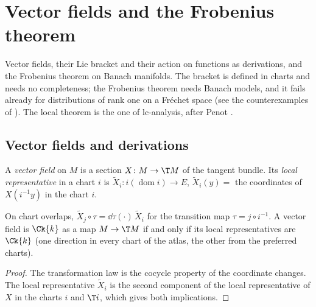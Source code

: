 \chapter{Vector fields and the Frobenius theorem}
\label{chap:vectorfields}

Vector fields, their Lie bracket and their action on functions as derivations, and the Frobenius
theorem on Banach manifolds. The bracket is defined in charts and needs no completeness; the
Frobenius theorem needs Banach models, and it fails already for distributions of rank one on a
Fréchet space (see the counterexamples of \cite{LCA}). The local theorem is the one of
lc-analysis, after Penot \cite{Pen70}.

\section{Vector fields and derivations}

\begin{definition}
  \label{def:vector-field}
  \leanok
  A \emph{vector field} on $M$ is a section $X \colon M \to \T M$ of the tangent bundle. Its
  \emph{local representative} in a chart $i$ is $\widetilde{X}_i \colon i(\operatorname{dom} i)
  \to E$, $\widetilde{X}_i(y) = $ the coordinates of $X(i^{-1}y)$ in the chart $i$.
\end{definition}

\begin{proposition}
  \label{prop:man-localrep}
  \leanok
  On chart overlaps, $\widetilde{X}_j \circ \tau = \dd\tau(\cdot)\,\widetilde{X}_i$ for the
  transition map $\tau = j \circ i^{-1}$. A vector field is $\Ck{k}$ as a map $M \to \T M$ if and
  only if its local representatives are $\Ck{k}$ (one direction in every chart of the atlas, the
  other from the preferred charts).
\end{proposition}

\begin{proof}
  \leanok
  The transformation law is the cocycle property of the coordinate changes. The local
  representative $\widetilde{X}_i$ is the second component of the local representative of $X$ in
  the charts $i$ and $\T i$, which gives both implications.
\end{proof}

